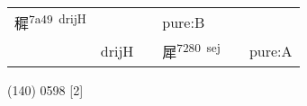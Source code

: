 \documentclass[14pt,a4paper]{scrartcl}
\begin{document}
\begin{longtable}[c]{@{}llllll@{}}
\begin{minipage}[t]{0.14\columnwidth}\raggedright\strut
穉\textsuperscript{7a49~drijH}
\strut\end{minipage} &
\begin{minipage}[t]{0.14\columnwidth}\raggedright\strut
\strut\end{minipage} &
\begin{minipage}[t]{0.14\columnwidth}\raggedright\strut
\strut\end{minipage} &
\begin{minipage}[t]{0.14\columnwidth}\raggedright\strut
pure:B
\strut\end{minipage}\tabularnewline
\begin{minipage}[t]{0.14\columnwidth}\raggedright\strut
𡱕
\strut\end{minipage} &
\begin{minipage}[t]{0.14\columnwidth}\raggedright\strut
drijH
\strut\end{minipage} &
\begin{minipage}[t]{0.14\columnwidth}\raggedright\strut
\strut\end{minipage} &
\begin{minipage}[t]{0.14\columnwidth}\raggedright\strut
犀\textsuperscript{7280~sej}
\strut\end{minipage} &
\begin{minipage}[t]{0.14\columnwidth}\raggedright\strut
\strut\end{minipage} &
\begin{minipage}[t]{0.14\columnwidth}\raggedright\strut
pure:A
\strut\end{minipage}\tabularnewline
\bottomrule
\end{longtable}

(140) 0598 {[}2{]}
\end{document}
